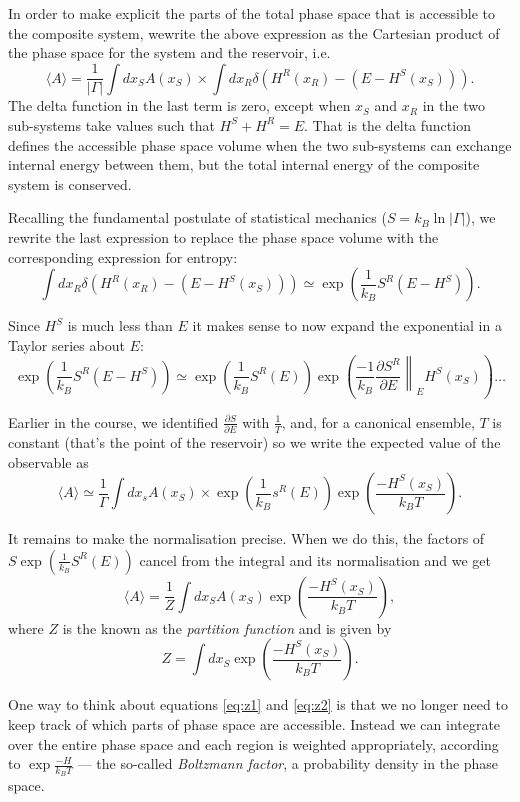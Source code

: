 In order to make explicit the parts of the total phase space that is accessible to the composite system, wewrite the above expression as the Cartesian product of the phase space for the system and the reservoir, i.e.
$$
	\langle A\rangle =\frac{1}{|\Gamma|}\int dx_SA(x_S)\times\int dx_R\delta(H^R(x_R)-(E-H^S(x_S))).
$$
The delta function in the last term is zero, except when $x_S$ and $x_R$ in the two sub-systems take values such that $H^S+H^R=E$. That is the delta function defines the accessible phase space volume when the two sub-systems can exchange internal energy between them, but the total internal energy of the composite system is conserved.

Recalling the fundamental postulate of statistical mechanics ($S=k_B\ln|\Gamma|$), we rewrite the last expression to replace the phase space volume with the corresponding expression for entropy:
$$
	\int dx_R\delta(H^R(x_R)-(E-H^S(x_S))) \simeq \exp\left(\frac{1}{k_B}S^R(E-H^S)\right).
$$

Since $H^S$ is much less than $E$ it makes sense to now expand the exponential in a Taylor series about $E$:
$$
	\exp\left(\frac{1}{k_B}S^R(E-H^S)\right)\simeq \exp\left(\frac{1}{k_B}S^R(E)\right)\exp\left(\frac{-1}{k_B}\left.\frac{\partial S^R}{\partial E}\right\|_E H^S(x_S)\right)\ldots
$$

Earlier in the course, we identified $\frac{\partial S}{\partial E}$ with $\frac{1}{T}$, and, for a canonical ensemble, $T$ is constant (that's the point of the reservoir) so we write the expected value of the observable as
$$
	\langle A\rangle \simeq \frac{1}{\Gamma}\int dx_sA(x_S)\times\exp\left(\frac{1}{k_B}s^R(E)\right)\exp\left(\frac{-H^S(x_S)}{k_BT}\right).
$$

It remains to make the normalisation precise. When we do this, the factors of $S\exp\left(\frac{1}{k_B}S^R(E)\right)$ cancel from the integral and its normalisation and we get
\begin{equation}
	\langle A\rangle = \frac{1}{Z}\int dx_SA(x_S)\exp\left(\frac{-H^S(x_S)}{k_BT}\right),
	\label{eq:z1}
\end{equation}
where $Z$ is the known as the \emph{partition function} and is given by
\begin{equation}
	Z = \int dx_S\exp\left(\frac{-H^S(x_S)}{k_BT}\right).
	\label{eq:z2}
\end{equation}

One way to think about equations \ref{eq:z1} and \ref{eq:z2} is that we no longer need to keep track of which parts of phase space are accessible. Instead we can integrate over the entire phase space and each region is weighted appropriately, according to $\exp\frac{-H}{k_BT}$ --- the so-called \emph{Boltzmann factor}, a probability density in the phase space.

